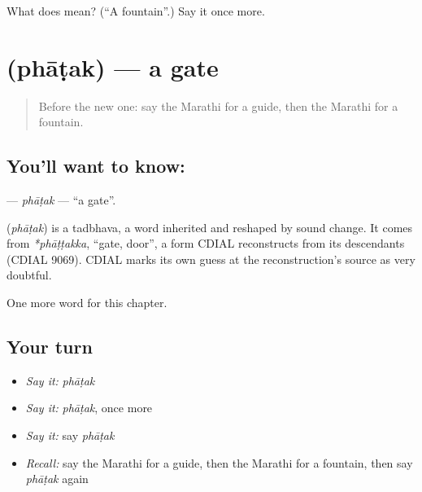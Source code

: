 \begin{tcolorbox}[breakable,colback=teal!4,colframe=teal!35!black,title={Before you move on}]
What does  mean? (\textquotedblleft{}A fountain\textquotedblright{}.) Say it once more.
\end{tcolorbox}
\section[\texorpdfstring{\mr{फाटक} (phāṭak)}{फाटक (phāṭak)}]{ (phāṭak) — a gate}

\label{lesson:MR-C213-phatak}



\begin{quote}
Before the new one: say the Marathi for a guide, then the Marathi for a fountain.
\end{quote}

\subsection*{You'll want to know: }
\textbf{} — \emph{phāṭak} — \textquotedblleft{}a gate\textquotedblright{}.

\begin{cousinweb}
\textbf{} (\emph{phāṭak}) is a tadbhava, a word inherited and reshaped by sound change. It comes from \emph{*phāṭṭakka}, \textquotedblleft{}gate, door\textquotedblright{}, a form CDIAL reconstructs from its descendants (CDIAL 9069). CDIAL marks its own guess at the reconstruction's source as very doubtful.
\end{cousinweb}

\begin{grammarlens}[title={What you've built}]
One more word for this chapter.
\end{grammarlens}

\subsection*{Your turn}
\begin{itemize}
\raggedright
  \item \emph{Say it:} \emph{phāṭak}
  \item \emph{Say it:} \emph{phāṭak}, once more
  \item \emph{Say it:} say \emph{phāṭak}
  \item \emph{Recall:} say the Marathi for a guide, then the Marathi for a fountain, then say \emph{phāṭak} again
\end{itemize}

